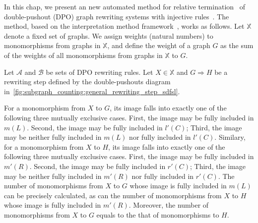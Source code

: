 
In this chap, we present an new automated method for relative termination~\cite{geser1990relative} of double-pushout (DPO) graph rewriting systems with injective rules~\cite{corradini1997algebraic,habel2001double,konig2018atutorial}. The method, based on the interpretation method framework~\cite{nipkow1998term}, works as follows. Let \( \mathbb{X} \) denote a fixed set of graphs. We assign weights (natural numbers) to monomorphisms from graphs in \( \mathbb{X} \), and define the weight of a graph $G$ as the sum of the weights of all monomorphisms from graphs in \( \mathbb{X} \) to $G$. 

Let $\mathcal{A}$ and $\mathcal{B}$ be sets of DPO rewriting rules. Let $X \in \mathbb{X}$ and $G \Rightarrow H$ be a rewriting step defined by the double-pushouts diagram in~\autoref{fig:subgraph_counting:general_rewriting_step_sdfsl}.
\begin{figure}[!ht]
    \centering
    \caption{}
    \label{fig:subgraph_counting:general_rewriting_step_sdfsl}
\end{figure}

For a monomorphism from $X$ to $G$, its image falls into exactly one of the following three mutually exclusive cases. First, the image may be fully included in $m(L)$. Second, the image may be fully included in $l'(C)$; Third, the image may be neither fully included in $m(L)$ nor fully included in $l'(C)$. Similary, for a monomorphism from $X$ to $H$, its image falls into exactly one of the following three mutually exclusive cases. First, the image may be fully included in $m'(R)$. Second, the image may be fully included in $r'(C)$; Third, the image may be neither fully included in $m'(R)$ nor fully included in $r'(C)$. The number of monomorphisms from $X$ to $G$ whose image is fully included in $m(L)$ can be precisely calculated, as can the number of monomorphisms from $X$ to $H$ whose image is fully included in $m'(R)$. Moreover, the number of monomorphisms from $X$ to $G$ equals to the that of monomorphisms to $H$. 


